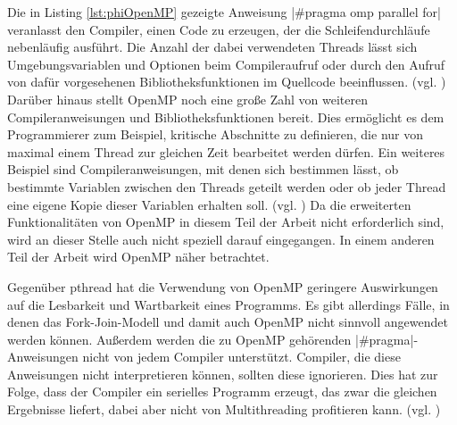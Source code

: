 \documentclass[../main.tex]{subfiles}
\begin{document}
Die in Listing \ref{lst:phiOpenMP} gezeigte Anweisung |#pragma omp parallel for| veranlasst den Compiler, einen Code zu erzeugen, der die Schleifendurchläufe nebenläufig ausführt. Die Anzahl der dabei verwendeten Threads lässt sich Umgebungsvariablen und Optionen beim Compileraufruf oder durch den Aufruf von dafür vorgesehenen Bibliotheksfunktionen im Quellcode beeinflussen. (vgl. \cite{phiOpenmpDoku}) Darüber hinaus stellt OpenMP noch eine große Zahl von weiteren Compileranweisungen und Bibliotheksfunktionen bereit. Dies ermöglicht es dem Programmierer zum Beispiel, kritische Abschnitte zu definieren, die nur von maximal einem Thread zur gleichen Zeit bearbeitet werden dürfen. Ein weiteres Beispiel sind Compileranweisungen, mit denen sich bestimmen lässt, ob bestimmte Variablen zwischen den Threads geteilt werden oder ob jeder Thread eine eigene Kopie dieser Variablen erhalten soll. (vgl. \cite{phiOpenmpDoku}) Da die erweiterten Funktionalitäten von OpenMP in diesem Teil der Arbeit nicht erforderlich sind, wird an dieser Stelle auch nicht speziell darauf eingegangen. In einem anderen Teil der Arbeit wird OpenMP näher betrachtet. 

Gegenüber pthread hat die Verwendung von OpenMP geringere Auswirkungen auf die Lesbarkeit und Wartbarkeit eines Programms. Es gibt allerdings Fälle, in denen das Fork-Join-Modell und damit auch OpenMP nicht sinnvoll angewendet werden können. Außerdem werden die zu OpenMP gehörenden |#pragma|-Anweisungen nicht von jedem Compiler unterstützt. Compiler, die diese Anweisungen nicht interpretieren können, sollten diese ignorieren. Dies hat zur Folge, dass der Compiler ein serielles Programm erzeugt, das zwar die gleichen Ergebnisse liefert, dabei aber nicht von Multithreading profitieren kann. (vgl. \cite{phiOpenmpDoku})
\end{document}

